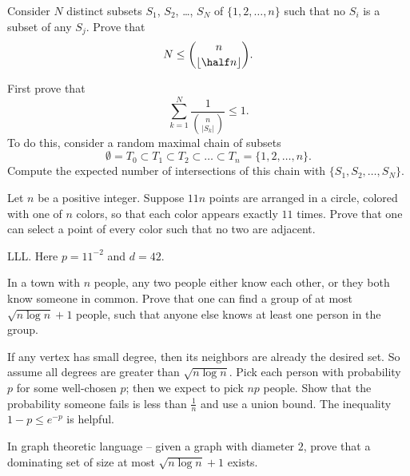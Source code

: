 \documentclass[11pt]{scrartcl}
\begin{document}
\begin{problem}
  [Sperner] Consider $N$ distinct subsets $S_1$, $S_2$, \dots, $S_N$ of $\{1,2,\dots,n\}$ such that no $S_i$
  is a subset of any $S_j$.
  Prove that
  \[ N \le \binom{n}{\left\lfloor \half n \right\rfloor}. \]
  \begin{sketch}
    First prove that \[ \sum_{k=1}^N \frac{1}{\binom{n}{\left\lvert S_k \right\rvert}} \le 1. \]
    To do this, consider a random maximal chain of subsets
    \[ \emptyset = T_0 \subset T_1 \subset T_2 \subset \dots \subset T_n = \{1,2,\dots,n\}. \]
    Compute the expected number of intersections of this chain with $\{S_1, S_2, \dots, S_N\}$.
  \end{sketch}
\end{problem}

\begin{problem}
  Let $n$ be a positive integer. Suppose $11n$ points are arranged in a circle,
  colored with one of $n$ colors, so that
  each color appears exactly $11$ times.
  Prove that one can select a point of every color such that no two are adjacent.
  \begin{sketch}
    LLL. Here $p = 11^{-2}$ and $d = 42$.
  \end{sketch}
\end{problem}

\begin{problem}
  In a town with $n$ people, any two people either know each other, or they both know someone in common.
  Prove that one can find a group of at most $\sqrt{n \log n} + 1$ people, such that anyone else knows
  at least one person in the group.
  \begin{sketch}
    If any vertex has small degree, then its neighbors are already the desired set.
    So assume all degrees are greater than $\sqrt{n \log n}$.
    Pick each person with probability $p$ for some well-chosen $p$; then we expect to pick $np$ people.
    Show that the probability someone fails is less than $\frac 1n$ and use a union bound.
    The inequality $1-p \le e^{-p}$ is helpful.
  \end{sketch}
\end{problem}
\begin{remark*}
  In graph theoretic language -- given a graph with diameter $2$, prove that a dominating set of
  size at most $\sqrt{n \log n} + 1$ exists.
\end{remark*}
\end{document}
